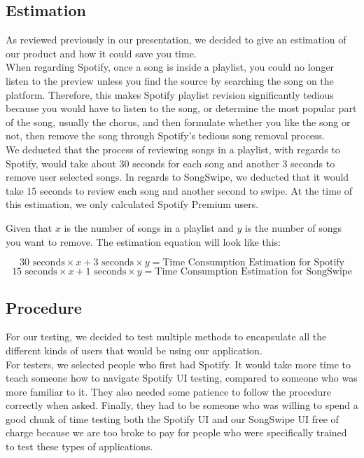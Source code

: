 \documentclass{article}
\begin{document}
\subsection{Estimation}
\quad As reviewed previously in our presentation, we decided to give an estimation of our product and how it could save you time. \\

When regarding Spotify, once a song is inside a playlist, you could no longer listen to the preview unless you find the source by searching the song on the platform. Therefore, this makes Spotify playlist revision significantly tedious because you would have to listen to the song, or determine the most popular part of the song, usually the chorus, and then formulate whether you like the song or not, then remove the song through Spotify’s tedious song removal process. \\

We deducted that the process of reviewing songs in a playlist, with regards to Spotify, would take about 30 seconds for each song and another 3 seconds to remove user selected songs. In regards to SongSwipe, we deducted that it would take 15 seconds to review each song and another second to swipe. At the time of this estimation, we only calculated Spotify Premium users.

\begin{center}
Given that $x$ is the number of songs in a playlist and $y$ is the number of songs you want to remove. The estimation equation will look like this:
\end{center}
\begin{equation}
30 \text{ seconds} \times x + 3 \text{ seconds} \times y = \text{Time Consumption Estimation for Spotify}
\end{equation}
\begin{equation}
15 \text{ seconds} \times x + 1 \text{ seconds} \times y = \text{Time Consumption Estimation for SongSwipe}
\end{equation}
\subsection{Procedure}
    For our testing, we decided to test multiple methods to encapsulate all the different kinds of users that would be using our application. \\

    For testers, we selected people who first had Spotify. It would take more time to teach someone how to navigate Spotify UI testing, compared to someone who was more familiar to it. They also needed some patience to follow the procedure correctly when asked. Finally, they had to be someone who was willing to spend a good chunk of time testing both the Spotify UI and our SongSwipe UI free of charge because we are too broke to pay for people who were specifically trained to test these types of applications.
\end{document}
